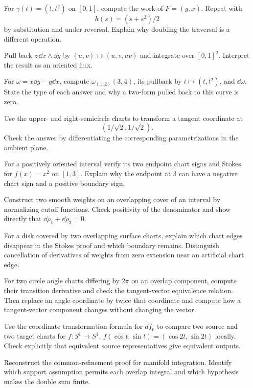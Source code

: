 \begin{exercise}
For $\gamma(t)=(t,t^2)$ on $[0,1]$, compute the work of $F=(y,x)$.
Repeat with
\[
h(s)=(s+s^2)/2
\]
 by substitution and under reversal.
Explain why doubling the traversal is a different operation.
\end{exercise}
\begin{exercise}
Pull back $z\,\dd x\wedge\dd y$ by $(u,v)\mapsto(u,v,uv)$ and
integrate over $[0,1]^2$. Interpret the result as an oriented flux.
\end{exercise}
\begin{exercise}
For $\omega=x\dd y-y\dd x$, compute $\omega_{(1,2)}(3,4)$,
its pullback by $t\mapsto(t,t^2)$, and $\dd\omega$. State the type
of each answer and why a two-form pulled back to this curve is zero.
\end{exercise}
\begin{exercise}
Use the upper- and right-semicircle charts to transform a tangent
coordinate at
\[
(1/\sqrt2,1/\sqrt2).
\]
 Check the answer by differentiating
the corresponding parametrizations in the ambient plane.
\end{exercise}
\begin{exercise}
For a positively oriented interval verify its two endpoint chart signs
and Stokes for $f(x)=x^2$ on $[1,3]$. Explain why the endpoint at
$3$ can have a negative chart sign and a positive boundary sign.
\end{exercise}
\begin{exercise}
Construct two smooth weights on an overlapping cover of an interval by
normalizing cutoff functions. Check positivity of the denominator and
show directly that $\dd\rho_1+\dd\rho_2=0$.
\end{exercise}
\begin{exercise}
For a disk covered by two overlapping surface charts, explain which
chart edges disappear in the Stokes proof and which boundary remains.
Distinguish cancellation of derivatives of weights from zero extension
near an artificial chart edge.
\end{exercise}

\begin{exercise}
For two circle angle charts differing by $2\pi$ on an overlap component,
compute their transition derivative and check the tangent-vector equivalence
relation. Then replace an angle coordinate by twice that coordinate and
compute how a tangent-vector component changes without changing the vector.
\end{exercise}
\begin{exercise}
Use the coordinate transformation formula for $df_p$ to compare two source
and two target charts for $f:S^1\to S^1$, $f(\cos t,\sin t)=(\cos 2t,\sin 2t)$ locally.
Check explicitly that equivalent source representatives give equivalent outputs.
\end{exercise}
\begin{exercise}
Reconstruct the common-refinement proof for manifold integration. Identify
which support assumption permits each overlap integral and which hypothesis
makes the double sum finite.
\end{exercise}

